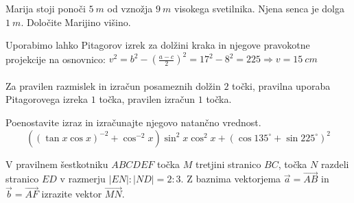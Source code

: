 \documentclass[addpoints]{exam}
\begin{document}
\begin{questions}

    \question[2]
        Marija stoji ponoči $5~m$ od vznožja $9~m$ visokega svetilnika. Njena senca je dolga $1~m$.
        Določite Marijino višino.


    \begin{solution}[2cm]
        Uporabimo lahko Pitagorov izrek za dolžini kraka in njegove pravokotne projekcije na osnovnico: $v^2=b^2-\left(\frac{a-c}{2}\right)^2=17^2-8^2=225 \Rightarrow v=15~cm$ \\ \\
        Za pravilen razmislek in izračun posameznih dolžin $2$ točki, pravilna uporaba Pitagorovega izreka $1$ točka, pravilen izračun $1$ točka.
    \end{solution}




\newpage

    \question[6]
    Poenostavite izraz in izračunajte njegovo natančno vrednost. 
    $$\displaystyle \left(\left(\tan{x}\cos{x}\right)^{-2}+\cos^{-2}{x}\right)\sin^2{x}\cos^2{x} + \left(\cos{135^\circ}+\sin{225^\circ}\right)^2$$

    \begin{solution}[12cm]
       
    \end{solution}




       



    \question[3]
    V pravilnem šestkotniku $ABCDEF$ točka $M$ tretjini stranico $BC$, točka $N$ razdeli stranico $ED$ v razmerju $|EN|:|ND|=2:3$.
    Z baznima vektorjema $\overrightarrow{a}=\overrightarrow{AB}$ in $\overrightarrow{b}=\overrightarrow{AF}$ izrazite vektor $\overrightarrow{MN}$. 


\end{questions}
\end{document}
